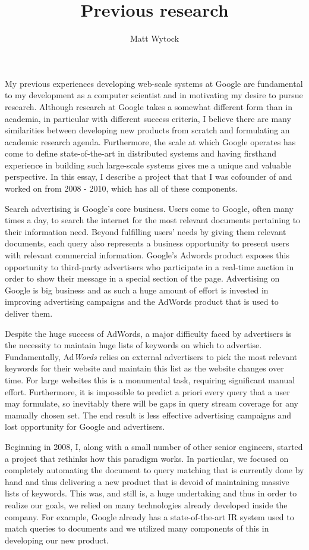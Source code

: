 \documentclass[12pt]{article}
\title{Previous research}
\author{Matt Wytock}
\begin{document}
My previous experiences developing web-scale systems at Google are fundamental to my development as a computer scientist and in motivating my desire to pursue research. Although research at Google takes a somewhat different form than in academia, in particular with different success criteria, I believe there are many similarities between developing new products from scratch and formulating an academic research agenda. Furthermore, the scale at which Google operates has come to define state-of-the-art in distributed systems and having firsthand experience in building such large-scale systems gives me a unique and valuable perspective. In this essay, I describe a project that that I was cofounder of and worked on from 2008 - 2010, which has all of these components.

Search advertising is Google's core business. Users come to Google, often many times a day, to search the internet for the most relevant documents pertaining to their information need. Beyond fulfilling users' needs by giving them relevant documents, each query also represents a business opportunity to present users with relevant commercial information. Google's Adwords product exposes this opportunity to third-party advertisers who participate in a real-time auction in order to show their message in a special section of the page. Advertising on Google is big business and as such a huge amount of effort is invested in improving advertising campaigns and the AdWords product that is used to deliver them.

Despite the huge success of AdWords, a major difficulty faced by advertisers is the necessity to maintain huge lists of keywords on which to advertise. Fundamentally, Ad\emph{Words} relies on external advertisers to pick the most relevant keywords for their website and maintain this list as the website changes over time. For large websites this is a monumental task, requiring significant manual effort. Furthermore, it is impossible to predict a priori every query that a user may formulate, so inevitably there will be gaps in query stream coverage for any manually chosen set. The end result is less effective advertising campaigns and lost opportunity for Google and advertisers.

Beginning in 2008, I, along with a small number of other senior engineers, started a project that rethinks how this paradigm works. In particular, we focused on completely automating the document to query matching that is currently done by hand and thus delivering a new product that is devoid of maintaining massive lists of keywords. This was, and still is, a huge undertaking and thus in order to realize our goals, we relied on many technologies already developed inside the company. For example, Google already has a state-of-the-art IR system used to match queries to documents and we utilized many components of this in developing our new product.
\end{document}
